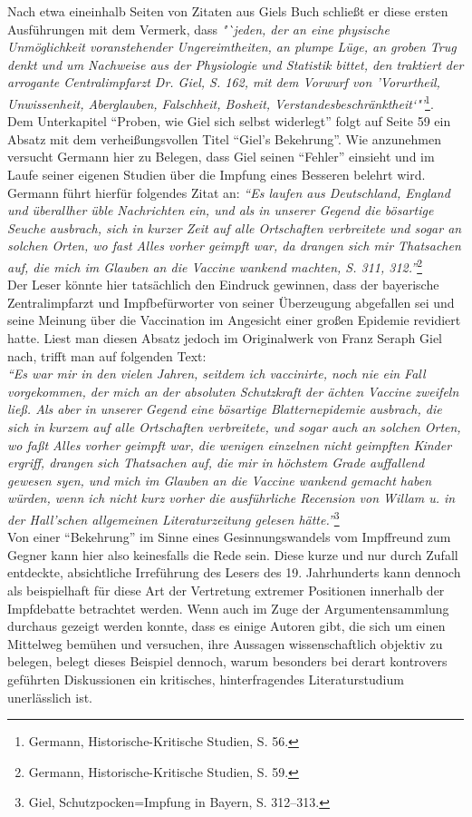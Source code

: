 \documentclass[
    a4paper,
    12pt,
    hyphens,
    chapterprefix=true,
    headheight=33pt,
    footheight=29pt,
    headings=optiontohead,
]{scrartcl}
\begin{document}
{Nach etwa eineinhalb Seiten von Zitaten aus Giels Buch schließt er diese ersten Ausführungen mit dem Vermerk, dass \textit{"`jeden, der an eine physische Unmöglichkeit voranstehender Ungereimtheiten, an plumpe Lüge, an groben Trug denkt und um Nachweise aus der Physiologie und Statistik bittet, den traktiert der arrogante Centralimpfarzt Dr. Giel, S. 162, mit dem Vorwurf von 'Vorurtheil, Unwissenheit, Aberglauben, Falschheit, Bosheit, Verstandesbeschränktheit`"'}\footnote{Germann, Historische-Kritische Studien, S. 56.}.\\
Dem Unterkapitel "`Proben, wie Giel sich selbst widerlegt"' folgt auf Seite 59 ein Absatz mit dem verheißungsvollen Titel "`Giel's Bekehrung"'. Wie anzunehmen versucht Germann hier zu Belegen, dass Giel seinen "`Fehler"' einsieht und im Laufe seiner eigenen Studien über die Impfung eines Besseren belehrt wird. Germann führt hierfür folgendes Zitat an:  \textit{"`Es laufen aus Deutschland, England und überallher üble Nachrichten ein, und als in unserer Gegend die bösartige Seuche ausbrach, sich in kurzer Zeit auf alle Ortschaften verbreitete und sogar an solchen Orten, wo fast Alles vorher geimpft war, da drangen sich mir Thatsachen auf, die mich im Glauben an die Vaccine wankend machten, S. 311, 312."'}\footnote{Germann, Historische-Kritische Studien, S. 59.}\\
Der Leser könnte hier tatsächlich den Eindruck gewinnen, dass der bayerische Zentralimpfarzt und Impfbefürworter von seiner Überzeugung abgefallen sei und seine Meinung über die Vaccination im Angesicht einer großen Epidemie revidiert hatte. Liest man diesen Absatz jedoch im Originalwerk von Franz Seraph Giel nach, trifft man auf folgenden Text: \\
\textit{"`Es war mir in den vielen Jahren, seitdem ich vaccinirte, noch nie ein Fall vorgekommen, der mich an der absoluten Schutzkraft der ächten Vaccine zweifeln ließ. Als aber in unserer Gegend eine bösartige Blatternepidemie ausbrach, die sich in kurzem auf alle Ortschaften verbreitete, und sogar auch an solchen Orten, wo faßt Alles vorher geimpft war, die wenigen einzelnen nicht geimpften Kinder ergriff, drangen sich Thatsachen auf, die mir in höchstem Grade auffallend gewesen syen, und mich im Glauben an die Vaccine wankend gemacht haben würden, wenn ich nicht kurz vorher die ausführliche Recension von Willam u. in der Hall'schen allgemeinen Literaturzeitung gelesen hätte."'}\footnote{Giel, Schutzpocken=Impfung in Bayern, S. 312--313.}\\
Von einer "`Bekehrung"' im Sinne eines Gesinnungswandels vom Impffreund zum Gegner kann hier also keinesfalls die Rede sein. Diese kurze und nur durch Zufall entdeckte, absichtliche Irreführung des Lesers des 19. Jahrhunderts kann dennoch als beispielhaft für diese Art der Vertretung extremer Positionen innerhalb der Impfdebatte betrachtet werden. Wenn auch im Zuge der Argumentensammlung durchaus gezeigt werden konnte, dass es einige Autoren gibt, die sich um einen Mittelweg bemühen und versuchen, ihre Aussagen wissenschaftlich objektiv zu belegen, belegt dieses Beispiel dennoch, warum besonders bei derart kontrovers geführten Diskussionen ein kritisches, hinterfragendes Literaturstudium unerlässlich ist.\\
}
\end{document}
